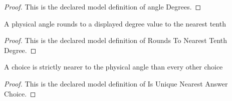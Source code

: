 \begin{proof}
  This is the declared model definition of angle Degrees.
\end{proof}
\begin{definition}
  \label{def:physics:phyx-mini-0146:phyxminiproblems-problemphyxmini0146-roundstonearesttenthdegree}
  A physical angle rounds to a displayed degree value to the nearest tenth
\end{definition}
\begin{proof}
  This is the declared model definition of Rounds To Nearest Tenth Degree.
\end{proof}
\begin{definition}
  \label{def:physics:phyx-mini-0146:phyxminiproblems-problemphyxmini0146-isuniquenearestanswerchoice}
  A choice is strictly nearer to the physical angle than every other choice
\end{definition}
\begin{proof}
  This is the declared model definition of Is Unique Nearest Answer Choice.
\end{proof}
